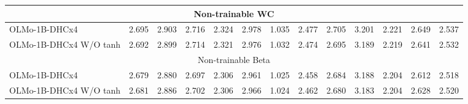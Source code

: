 \begin{table}[h]
{\begin{minipage}{\textheight}
\begin{tabular}{lcccccccccccr}
\midrule
\multicolumn{13}{c}{\cellcolor{gray!20} Non-trainable WC} \\
\midrule
OLMo-1B-DHCx4 & 2.695 & 2.903 & 2.716 & 2.324 & 2.978 & 1.035 & 2.477 & 2.705 & 3.201 & 2.221 & 2.649 & 2.537 \\
OLMo-1B-DHCx4 W/O tanh & 2.692 & 2.899 & 2.714 & 2.321 & 2.976 & 1.032 & 2.474 & 2.695 & 3.189 & 2.219 & 2.641 & 2.532 \\
\midrule
\multicolumn{13}{c}{\cellcolor{gray!20} Non-trainable Beta} \\
\midrule
OLMo-1B-DHCx4 & 2.679 & 2.880 & 2.697 & 2.306 & 2.961 & 1.025 & 2.458 & 2.684 & 3.188 & 2.204 & 2.612 & 2.518 \\
OLMo-1B-DHCx4 W/O tanh & 2.681 & 2.886 & 2.702 & 2.306 & 2.966 & 1.024 & 2.462 & 2.680 & 3.183 & 2.204 & 2.628 & 2.520 \\
\bottomrule
\end{tabular}
\label{tab:v3_validation_set_loss}
\end{minipage}
}
\end{table}


